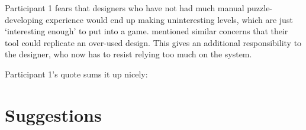 Participant 1 fears that designers who have not had much manual puzzle-developing experience would end up making uninteresting levels, which are just `interesting enough' to put into a game. \cite{Guzdial} mentioned similar concerns that their tool could replicate an over-used design. This gives an additional responsibility to the designer, who now has to resist relying too much on the system.

Participant 1's quote sums it up nicely: 
\textit{} %

\section{Suggestions}

